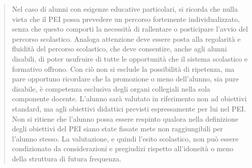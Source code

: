 \begin{quote}
	\mancatesto
	 Nel caso di alunni con esigenze educative particolari, si ricorda che nulla vieta che il PEI possa prevedere un percorso fortemente individualizzato, senza che questo comporti la necessità di rallentare o posticipare l'avvio del percorso scolastico. Analoga attenzione deve essere posta alla regolarità e fluidità del percorso scolastico, che deve consentire, anche agli alunni disabili, di poter usufruire di tutte le opportunità che il sistema scolastico e formativo offrono. Con ciò non si esclude la possibilità di ripetenza, ma pare opportuno ricordare che la promozione o meno dell'alunno, sia pure disabile, è competenza esclusiva degli organi collegiali nella sola componente docente.  L'alunno sarà valutato in riferimento non ad obiettivi standard, ma agli obiettivi didattici previsti espressamente per lui nel PEI. Non si ritiene che l'alunno possa essere respinto qualora nella definizione degli obiettivi del PEI siano state fissate mete non raggiungibili per l'alunno stesso.  La valutazione, e quindi l'esito scolastico, non può essere condizionato da considerazioni e pregiudizi rispetto all'idoneità o meno della struttura di futura frequenza.
\end{quote}
